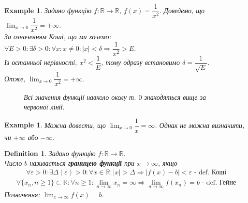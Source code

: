 \documentclass[a4paper, 14pt]{article}
\def\huge{\displaystyle}
\theoremstyle{theoremdd}
\theoremstyle{theoremdd}
\newtheorem{definition}[theorem]{Definition}
\theoremstyle{theoremdd}
\theoremstyle{theoremdd}
\newtheorem{example}[theorem]{Example}
\theoremstyle{theoremdd}
\theoremstyle{theoremdd}
\theoremstyle{theoremdd}
\theoremstyle{theoremdd}
\begin{document}
	\begin{example}
	Задано функцію $f: \mathbb{R} \to \mathbb{R}$, $f(x) = \dfrac{1}{x^2}$. Доведемо, що $\huge\lim_{x \to 0} \dfrac{1}{x^2} = +\infty$.\\
	За означенням Коші, що ми хочемо:\\
	$\forall E > 0: \exists \delta > 0: \forall x: x \neq 0: |x|<\delta \Rightarrow \dfrac{1}{x^2} > E$.\\
	Із останньої нерівності, $x^2 < \dfrac{1}{E}$, тому одразу встановимо $\delta = \dfrac{1}{\sqrt{E}}$.\\
	Отже, $\huge\lim_{x \to 0} \dfrac{1}{x^2} = +\infty$.
\begin{figure} [H]
\centering
{}
\caption*{Всі значення функції навколо околу т. $0$ знаходяться вище за червоної лінії.}
\end{figure}
	\end{example}
	
	\begin{example}
	Можна довести, що $\huge\lim_{x \to 0} \dfrac{1}{x} = \infty$. Однак не можна визначити, чи $+\infty$ або $-\infty$.
	\end{example}
	
	\begin{definition}
	Задано функцію $f: \mathbb{R} \to \mathbb{R}$. \\
	Число $b$ називається \textbf{границею функції} при $x \to \infty$, якщо
	\begin{align*}
	\forall \varepsilon > 0: \exists \Delta(\varepsilon) > 0: \forall x \in \mathbb{R}: |x|>\Delta \Rightarrow |f(x)-b|<\varepsilon \textrm{ - def. Коші}
	\end{align*}
	\begin{align*}
	\forall \{x_n, n \geq 1\} \subset \mathbb{R}: \forall n \geq 1: \lim_{n \to \infty} x_n = \infty \Rightarrow \lim_{n \to \infty} f(x_n) = b \textrm{ - def. Гейне}
	\end{align*}
	Позначення: $\huge \lim_{x \to \infty} f(x) = b$.
	\end{definition}
	
\end{document}
